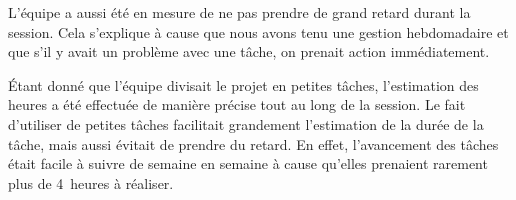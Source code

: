 	L’équipe a aussi été en mesure de ne pas prendre de grand retard durant la session. Cela s’explique à cause que nous avons tenu une gestion hebdomadaire et que s’il y avait un problème avec une tâche, on prenait action immédiatement. 

	Étant donné que l’équipe divisait le projet en petites tâches, l’estimation des heures a été effectuée de manière précise tout au long de la session. Le fait d’utiliser de petites tâches facilitait grandement l’estimation de la durée de la tâche, mais aussi évitait de prendre du retard. En effet, l’avancement des tâches était facile à suivre de semaine en semaine à cause qu’elles prenaient rarement plus de 4~heures à réaliser.

